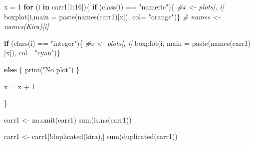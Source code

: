 \documentclass[
]{article}
\newenvironment{Shaded}{\begin{snugshade}}{\end{snugshade}}
\newcommand{\AttributeTok}[1]{\textcolor[rgb]{0.77,0.63,0.00}{#1}}
\newcommand{\CommentTok}[1]{\textcolor[rgb]{0.56,0.35,0.01}{\textit{#1}}}
\newcommand{\ControlFlowTok}[1]{\textcolor[rgb]{0.13,0.29,0.53}{\textbf{#1}}}
\newcommand{\DecValTok}[1]{\textcolor[rgb]{0.00,0.00,0.81}{#1}}
\newcommand{\FunctionTok}[1]{\textcolor[rgb]{0.00,0.00,0.00}{#1}}
\newcommand{\NormalTok}[1]{#1}
\newcommand{\OtherTok}[1]{\textcolor[rgb]{0.56,0.35,0.01}{#1}}
\newcommand{\SpecialCharTok}[1]{\textcolor[rgb]{0.00,0.00,0.00}{#1}}
\newcommand{\StringTok}[1]{\textcolor[rgb]{0.31,0.60,0.02}{#1}}
\begin{document}
\begin{Shaded}
\begin{Highlighting}[]
\NormalTok{x }\OtherTok{=} \DecValTok{1}
\ControlFlowTok{for}\NormalTok{ (i }\ControlFlowTok{in}\NormalTok{ carr1[}\DecValTok{1}\SpecialCharTok{:}\DecValTok{16}\NormalTok{])\{}
  \ControlFlowTok{if}\NormalTok{ (}\FunctionTok{class}\NormalTok{(i) }\SpecialCharTok{==} \StringTok{"numeric"}\NormalTok{)\{}
    \CommentTok{\#x \textless{}{-} plots[, i]}
    \FunctionTok{boxplot}\NormalTok{(i,}\AttributeTok{main =} \FunctionTok{paste}\NormalTok{(}\FunctionTok{names}\NormalTok{(carr1)[x]), }\AttributeTok{col=} \StringTok{"orange"}\NormalTok{)\}}
    \CommentTok{\# names \textless{}{-} names(Kira)[i]}
  
  
  
  \ControlFlowTok{if}\NormalTok{ (}\FunctionTok{class}\NormalTok{(i) }\SpecialCharTok{==} \StringTok{"integer"}\NormalTok{)\{}
    \CommentTok{\#x \textless{}{-} plots[, i]}
    \FunctionTok{boxplot}\NormalTok{(i, }\AttributeTok{main =} \FunctionTok{paste}\NormalTok{(}\FunctionTok{names}\NormalTok{(carr1)[x]), }\AttributeTok{col=} \StringTok{"cyan"}\NormalTok{)\}}
  
  
  \ControlFlowTok{else}\NormalTok{ \{}
    \FunctionTok{print}\NormalTok{(}\StringTok{"No plot"}\NormalTok{)}
\NormalTok{  \}}
  
\NormalTok{  x }\OtherTok{=}\NormalTok{ x }\SpecialCharTok{+} \DecValTok{1}
  
\NormalTok{\}}
\end{Highlighting}
\end{Shaded}

\begin{Shaded}
\begin{Highlighting}[]
\NormalTok{carr1 }\OtherTok{\textless{}{-}} \FunctionTok{na.omit}\NormalTok{(carr1)}
\FunctionTok{sum}\NormalTok{(}\FunctionTok{is.na}\NormalTok{(carr1))}
\end{Highlighting}
\end{Shaded}

\begin{Shaded}
\begin{Highlighting}[]
\NormalTok{carr1 }\OtherTok{\textless{}{-}}\NormalTok{ carr1[}\SpecialCharTok{!}\FunctionTok{duplicated}\NormalTok{(kira),]}
\FunctionTok{sum}\NormalTok{(}\FunctionTok{duplicated}\NormalTok{(carr1))}
\end{Highlighting}
\end{Shaded}
\end{document}
